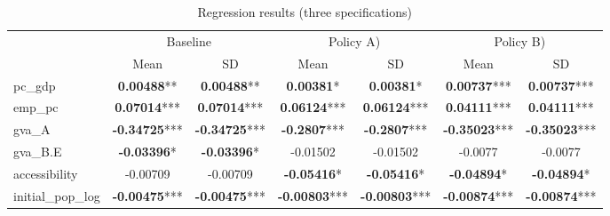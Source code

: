 \begin{table}[ht]
\centering
\begin{tabular}{l|cc|cc|cc}
  \multicolumn{1}{c}{} & \multicolumn{2}{c}{Baseline} & \multicolumn{2}{c}{Policy A)} & \multicolumn{2}{c}{Policy B)} \\ 
  & Mean & SD & Mean & SD & Mean & SD \\ 
  
 \hline
  \hline
pc_gdp & \textbf{0.00488}** & \textbf{0.00488}** & \textbf{0.00381}* & \textbf{0.00381}* & \textbf{0.00737}*** & \textbf{0.00737}*** \\ 
  emp_pc & \textbf{0.07014}*** & \textbf{0.07014}*** & \textbf{0.06124}*** & \textbf{0.06124}*** & \textbf{0.04111}*** & \textbf{0.04111}*** \\ 
  gva_A & \textbf{-0.34725}*** & \textbf{-0.34725}*** & \textbf{-0.2807}*** & \textbf{-0.2807}*** & \textbf{-0.35023}*** & \textbf{-0.35023}*** \\ 
  gva_B.E & \textbf{-0.03396}* & \textbf{-0.03396}* & -0.01502 & -0.01502 & -0.0077 & -0.0077 \\ 
  accessibility & -0.00709 & -0.00709 & \textbf{-0.05416}* & \textbf{-0.05416}* & \textbf{-0.04894}* & \textbf{-0.04894}* \\ 
  initial_pop_log & \textbf{-0.00475}*** & \textbf{-0.00475}*** & \textbf{-0.00803}*** & \textbf{-0.00803}*** & \textbf{-0.00874}*** & \textbf{-0.00874}*** \\ 
   \hline
\end{tabular}
\caption{Regression results (three specifications)} 
\label{tab:sdm_results}
\end{table}
